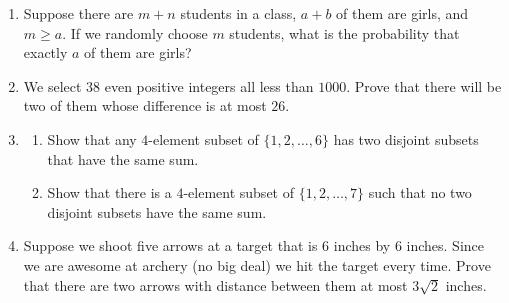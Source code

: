 \documentclass[11pt]{article}
\begin{document}
\begin{enumerate}
\item Suppose there are $m+n$ students in a class, $a+b$ of them are girls, and $m \ge a$.  If we randomly choose $m$ students, what is the probability that exactly $a$ of them are girls?

\item We select $38$ even positive integers all less than $1000$.  Prove that there will be two of them whose difference is at most $26$.

\item \begin{enumerate}
\item Show that any $4$-element subset of $\{1,2,\ldots, 6\}$ has two disjoint subsets that have the same sum.

\item Show that there is a $4$-element subset of $\{1,2,\ldots, 7\}$ such that no two disjoint subsets have the same sum.
\end{enumerate}

\item Suppose we shoot five arrows at a target that is $6$ inches by $6$ inches.  Since we are awesome at archery (no big deal) we hit the target every time.  Prove that there are two arrows with distance between them at most $3\sqrt{2}$ inches.



\end{enumerate}
\end{document}
